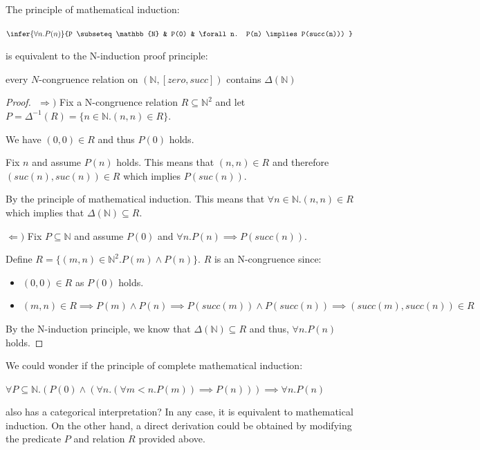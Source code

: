 \begin{thm}
	The principle of mathematical induction:
	
	$\infer{\forall n. P(n)}{%
		P \subseteq \mathbb{N}
		& P(0)
		& \forall n. P(n) \implies P(succ(n)))
	}$
	 
	is equivalent to the N-induction proof principle:
	
	every $N$-congruence relation on $(\mathbb{N},[zero,succ])$ contains $\Delta(\mathbb{N})$
\end{thm}
\begin{proof}
	$ $\newline
	$\Rightarrow)$ Fix a N-congruence relation $R \subseteq \mathbb{N}^2$ and let $P = \Delta^{-1}(R) = \{n \in \mathbb{N}. (n,n) \in R\}$.
	
	We have $(0,0) \in R$ and thus $P(0)$ holds.
	
	Fix $n$ and assume $P(n)$ holds. This means that $(n,n) \in R$ and therefore $(suc(n), suc(n)) \in R$ which implies $P(suc(n))$. 
	
	By the principle of mathematical induction. This means that $\forall n \in \mathbb{N}. (n,n) \in R$ which implies that $\Delta(\mathbb{N}) \subseteq R$. 
	
	$\Leftarrow)$ Fix $P \subseteq \mathbb{N}$ and assume $P(0)$ and $\forall n. P(n) \implies P(succ(n))$.
	
	Define $R = \{(m,n) \in \mathbb{N}^2. P(m) \land P(n)\}$. $R$ is an N-congruence since:
	
	\begin{itemize}
		\item $(0,0) \in R$ as $P(0)$ holds.
		\item $(m,n) \in R \implies P(m) \land P(n) \implies P(succ(m)) \land P(succ(n)) \implies (succ(m),succ(n)) \in R$
	\end{itemize}

	By the N-induction principle, we know that $\Delta(\mathbb{N}) \subseteq R$ and thus, $\forall n. P(n)$ holds.
\end{proof}

We could wonder if the principle of complete mathematical induction:

$\forall P \subseteq \mathbb{N}. (P(0) \land (\forall n. (\forall m < n. P(m)) \implies P(n))) \implies \forall n. P(n)$

also has a categorical interpretation? In any case, it is equivalent to mathematical induction. On the other hand, a direct derivation could be obtained by modifying the predicate $P$ and relation $R$ provided above. 

